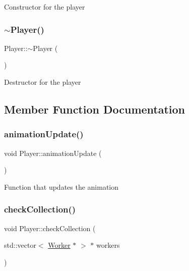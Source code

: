 Constructor for the player 

\mbox{\label{class_player_a749d2c00e1fe0f5c2746f7505a58c062}} 
\subsubsection{\texorpdfstring{$\sim$Player()}{~Player()}}
{\footnotesize\ttfamily Player\+::$\sim$\+Player (\begin{DoxyParamCaption}{ }\end{DoxyParamCaption})}



Destructor for the player 



\subsection{Member Function Documentation}
\mbox{\label{class_player_aa5083665c34ef45cf4a567433a31f9aa}} 
\subsubsection{\texorpdfstring{animationUpdate()}{animationUpdate()}}
{\footnotesize\ttfamily void Player\+::animation\+Update (\begin{DoxyParamCaption}{ }\end{DoxyParamCaption})}



Function that updates the animation 

\mbox{\label{class_player_aca6122d4de9a1325f63e369769cc1239}} 
\subsubsection{\texorpdfstring{checkCollection()}{checkCollection()}}
{\footnotesize\ttfamily void Player\+::check\+Collection (\begin{DoxyParamCaption}\item[{std\+::vector$<$ \mbox{\hyperlink{class_worker}{Worker}} $\ast$ $>$ $\ast$}]{workers }\end{DoxyParamCaption})}



